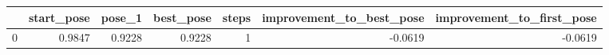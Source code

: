 \begin{tabular}{lrrrrrr}
\toprule
{} &  start\_pose &  pose\_1 &  best\_pose &  steps &  improvement\_to\_best\_pose &  improvement\_to\_first\_pose \\
\midrule
0 &      0.9847 &  0.9228 &     0.9228 &      1 &                   -0.0619 &                    -0.0619 \\
\bottomrule
\end{tabular}
